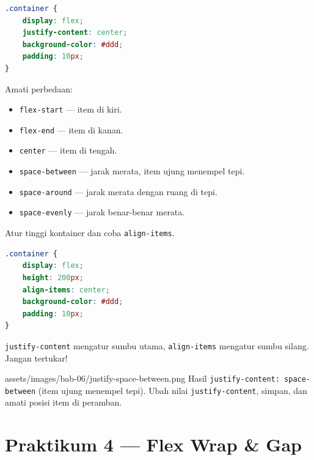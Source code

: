 \begin{lstlisting}[language=CSS, caption={justify-content}, label={lst:justify-content}]
.container {
    display: flex;
    justify-content: center;
    background-color: #ddd;
    padding: 10px;
}
\end{lstlisting}

Amati perbedaan:
\begin{itemize}
  \item \texttt{flex-start} --- item di kiri.
  \item \texttt{flex-end} --- item di kanan.
  \item \texttt{center} --- item di tengah.
  \item \texttt{space-between} --- jarak merata, item ujung menempel tepi.
  \item \texttt{space-around} --- jarak merata dengan ruang di tepi.
  \item \texttt{space-evenly} --- jarak benar-benar merata.
\end{itemize}

\begin{langkah}
  \item Atur tinggi kontainer dan coba \texttt{align-items}.
\end{langkah}

\begin{lstlisting}[language=CSS, caption={align-items}, label={lst:align-items}]
.container {
    display: flex;
    height: 200px;
    align-items: center;
    background-color: #ddd;
    padding: 10px;
}
\end{lstlisting}

\begin{tip}
\texttt{justify-content} mengatur sumbu utama, \texttt{align-items} mengatur sumbu silang. Jangan tertukar!
\end{tip}

\begin{tangkapanlayar}
  {assets/images/bab-06/justify-space-between.png}
  {Hasil \texttt{justify-content: space-between} (item ujung menempel tepi).}
  {Ubah nilai \texttt{justify-content}, simpan, dan amati posisi item di peramban.}
\end{tangkapanlayar}

\section{Praktikum 4 --- Flex Wrap \& Gap}
\label{sec:flex-praktik-4}

